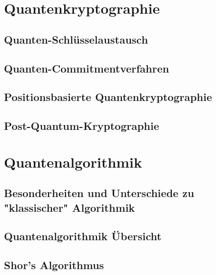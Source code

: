 
\section{Quantenkryptographie}
\label{sec:Quantenkryptographie}


\subsection{Quanten-Schl\"usselaustausch}
\label{sec:Quanten-Schlusselaustausch}


\subsection{Quanten-Commitmentverfahren}
\label{sec:Quanten-Commitmentverfahren}


\subsection{Positionsbasierte Quantenkryptographie}
\label{sec:Positionsbasierte Quantenkryptographie}


\subsection{Post-Quantum-Kryptographie}
\label{sec:Post-Quantum-Kryptographie}



\section{Quantenalgorithmik}
\label{sec:Quantenalgorithmik}


\subsection{Besonderheiten und Unterschiede zu "klassischer" Algorithmik}
\label{sec:Besonderheiten und Unterschiede zu "klassischer" Algorithmik}


\subsection{Quantenalgorithmik Übersicht}
\label{sec:Quantenalgorithmik Übersicht}


\subsection{Shor's Algorithmus}
\label{sec:Shor's Algorithmus}



